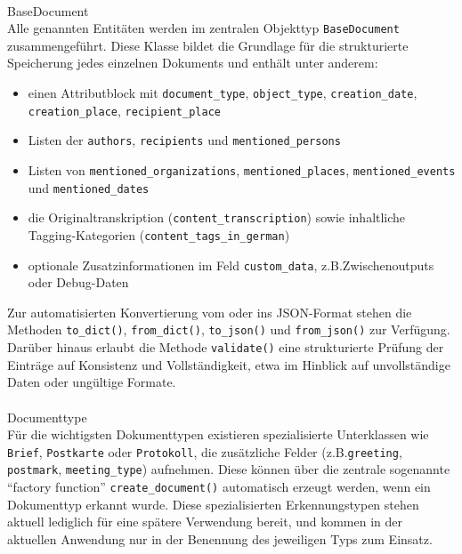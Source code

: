 \documentclass[12pt, a4paper, ngerman, bidi=default]{article}
\makeatletter
\newcommand{\code}[1]{\colorbox{VeryLightGray}{\texttt{#1}}} %
\let\oldparagraph\paragraph%
\renewcommand{\paragraph}{
    \@ifstar%
      \xxxParagraphStar%
      \xxxParagraphNoStar%
 }
\newcommand{\xxxParagraphStar}[1]{\oldparagraph*{#1}\mbox{}}
\newcommand{\xxxParagraphNoStar}[1]{\oldparagraph{#1}\mbox{}}
\makeatother
\begin{document}
\paragraph{BaseDocument}\\
Alle genannten Entitäten werden im zentralen Objekttyp \code{BaseDocument} zusammengeführt. Diese Klasse bildet 
die Grundlage für die strukturierte Speicherung jedes einzelnen Dokuments und enthält unter anderem:
\begin{itemize}
\item einen Attributblock mit \code{document\_type}, \code{object\_type}, \code{creation\_date}, \code{creation\_place}, \code{recipient\_place}
\item Listen der \code{authors}, \code{recipients} und \code{mentioned\_persons}
\item Listen von \code{mentioned\_organizations}, \code{mentioned\_places}, \code{mentioned\_events} und \code{mentioned\_dates}
\item die Originaltranskription (\code{content\_transcription}) sowie inhaltliche Tagging-Kategorien (\code{content\_tags\_in\_german})
\item optionale Zusatzinformationen im Feld \code{custom\_data}, z.B.Zwischenoutputs oder Debug-Daten
\end{itemize}

Zur automatisierten Konvertierung vom oder ins JSON-Format stehen die Methoden \code{to\_dict()}, \code{from\_dict()}, \code{to\_json()} und \code{from\_json()} zur Verfügung. Darüber hinaus erlaubt die Methode \code{validate()} eine strukturierte Prüfung der Einträge auf Konsistenz und Vollständigkeit, etwa im Hinblick auf unvollständige Daten oder ungültige Formate.

\paragraph{Documenttype}\\
Für die wichtigsten Dokumenttypen existieren spezialisierte Unterklassen wie \code{Brief}, 
\code{Postkarte} oder \code{Protokoll}, die zusätzliche Felder (z.B.\code{greeting}, \code{postmark}, \code{meeting\_type}) aufnehmen. 
Diese können über die zentrale sogenannte \enquote{factory function} \code{create\_document()} automatisch erzeugt werden, wenn ein Dokumenttyp erkannt wurde. 
Diese spezialisierten Erkennungstypen stehen aktuell lediglich für eine spätere Verwendung bereit, und kommen in der aktuellen Anwendung nur in der Benennung des jeweiligen Typs zum Einsatz.
\end{document}

